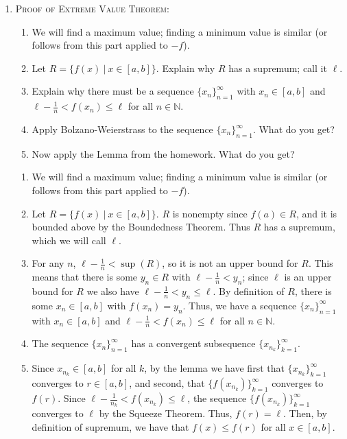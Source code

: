 \documentclass[12pt]{amsart}
\newcommand{\N}{\mathbb{N}}
\numberwithin{equation}{section}
\theoremstyle{plain} %
\theoremstyle{definition}
\theoremstyle{remark}
\begin{document}
\begin{enumerate}
\item \textsc{Proof of Extreme Value Theorem:}
\begin{enumerate}
\item[\null] We will find a maximum value; finding a minimum value is similar (or follows from this part applied to $-f$).
\item Let $R = \{ f(x) \ |\  x\in [a,b]\}$. Explain why $R$ has a supremum; call it $\ell$.
\item Explain why there must be a sequence $\{x_n\}_{n=1}^\infty$ with $x_n\in[a,b]$ and $\ell- \frac{1}{n} <f(x_n)\leq \ell$ for all $n\in \N$.
\item Apply Bolzano-Weierstrass to the sequence $\{x_n\}_{n=1}^\infty$. What do you get?
\item Now apply the Lemma from the homework. What do you get?
\end{enumerate}

\begin{framed}
\begin{enumerate}
\item[\null] We will find a maximum value; finding a minimum value is similar (or follows from this part applied to $-f$).
\item Let $R = \{ f(x) \ |\  x\in [a,b]\}$. $R$ is nonempty since $f(a)\in R$, and it is bounded above by the Boundedness Theorem. Thus $R$ has a supremum, which we will call $\ell$.
\item For any $n$, $\ell-\frac{1}{n} < \sup(R)$, so it is not an upper bound for $R$. This means that there is some $y_n\in R$ with $\ell-\frac{1}{n} < y_n$; since $\ell$ is an upper bound for $R$ we also have $\ell-\frac{1}{n} < y_n\leq \ell$. By definition of $R$, there is some $x_n\in [a,b]$ with $f(x_n) = y_n$. Thus, we have a sequence $\{x_n\}_{n=1}^\infty$ with $x_n\in[a,b]$ and $\ell- \frac{1}{n} <f(x_n)\leq \ell$ for all $n\in \N$.
\item The sequence $\{x_n\}_{n=1}^\infty$ has a convergent subsequence $\{x_{n_k}\}_{k=1}^\infty$.
\item Since $x_{n_k}\in[a,b]$ for all $k$, by the lemma we have first that $\{x_{n_k}\}_{k=1}^\infty$ converges to $r\in [a,b]$, and second, that $\{f(x_{n_k})\}_{k=1}^\infty$ converges to $f(r)$. Since $ \ell - \frac{1}{n_k} < f(x_{n_k})\leq \ell $, the sequence $\{f(x_{n_k})\}_{k=1}^\infty$ converges to $\ell$ by the Squeeze Theorem. Thus, $f(r) = \ell$. Then, by definition of supremum, we have that $f(x)\leq f(r)$ for all $x\in[a,b]$.
\end{enumerate}
\end{framed}





\end{enumerate}
\end{document}
